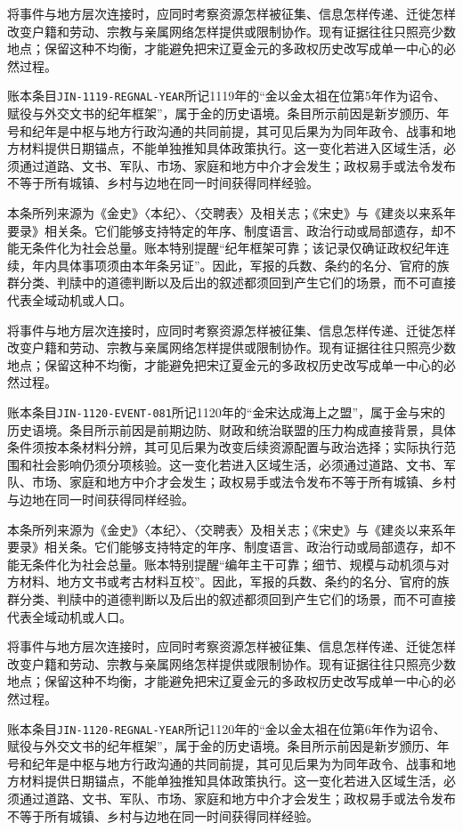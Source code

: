 将事件与地方层次连接时，应同时考察资源怎样被征集、信息怎样传递、迁徙怎样改变户籍和劳动、宗教与亲属网络怎样提供或限制协作。现有证据往往只照亮少数地点；保留这种不均衡，才能避免把宋辽夏金元的多政权历史改写成单一中心的必然过程。

账本条目\texttt{JIN-1119-REGNAL-YEAR}所记1119年的“金以金太祖在位第5年作为诏令、赋役与外交文书的纪年框架”，属于金的历史语境。条目所示前因是新岁颁历、年号和纪年是中枢与地方行政沟通的共同前提，其可见后果为为同年政令、战事和地方材料提供日期锚点，不能单独推知具体政策执行。这一变化若进入区域生活，必须通过道路、文书、军队、市场、家庭和地方中介才会发生；政权易手或法令发布不等于所有城镇、乡村与边地在同一时间获得同样经验。

本条所列来源为《金史》〈本纪〉、〈交聘表〉及相关志；《宋史》与《建炎以来系年要录》相关条。它们能够支持特定的年序、制度语言、政治行动或局部遗存，却不能无条件化为社会总量。账本特别提醒“纪年框架可靠；该记录仅确证政权纪年连续，年内具体事项须由本年条另证”。因此，军报的兵数、条约的名分、官府的族群分类、判牍中的道德判断以及后出的叙述都须回到产生它们的场景，而不可直接代表全域动机或人口。

将事件与地方层次连接时，应同时考察资源怎样被征集、信息怎样传递、迁徙怎样改变户籍和劳动、宗教与亲属网络怎样提供或限制协作。现有证据往往只照亮少数地点；保留这种不均衡，才能避免把宋辽夏金元的多政权历史改写成单一中心的必然过程。

账本条目\texttt{JIN-1120-EVENT-081}所记1120年的“金宋达成海上之盟”，属于金与宋的历史语境。条目所示前因是前期边防、财政和统治联盟的压力构成直接背景，具体条件须按本条材料分辨，其可见后果为改变后续资源配置与政治选择；实际执行范围和社会影响仍须分项核验。这一变化若进入区域生活，必须通过道路、文书、军队、市场、家庭和地方中介才会发生；政权易手或法令发布不等于所有城镇、乡村与边地在同一时间获得同样经验。

本条所列来源为《金史》〈本纪〉、〈交聘表〉及相关志；《宋史》与《建炎以来系年要录》相关条。它们能够支持特定的年序、制度语言、政治行动或局部遗存，却不能无条件化为社会总量。账本特别提醒“编年主干可靠；细节、规模与动机须与对方材料、地方文书或考古材料互校”。因此，军报的兵数、条约的名分、官府的族群分类、判牍中的道德判断以及后出的叙述都须回到产生它们的场景，而不可直接代表全域动机或人口。

将事件与地方层次连接时，应同时考察资源怎样被征集、信息怎样传递、迁徙怎样改变户籍和劳动、宗教与亲属网络怎样提供或限制协作。现有证据往往只照亮少数地点；保留这种不均衡，才能避免把宋辽夏金元的多政权历史改写成单一中心的必然过程。

账本条目\texttt{JIN-1120-REGNAL-YEAR}所记1120年的“金以金太祖在位第6年作为诏令、赋役与外交文书的纪年框架”，属于金的历史语境。条目所示前因是新岁颁历、年号和纪年是中枢与地方行政沟通的共同前提，其可见后果为为同年政令、战事和地方材料提供日期锚点，不能单独推知具体政策执行。这一变化若进入区域生活，必须通过道路、文书、军队、市场、家庭和地方中介才会发生；政权易手或法令发布不等于所有城镇、乡村与边地在同一时间获得同样经验。


